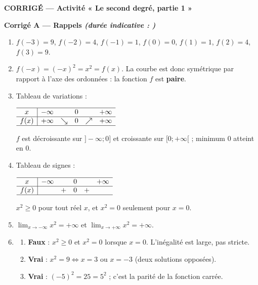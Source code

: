 \documentclass[11pt,a4paper]{article}
\newcommand{\partie}[2]{%
  \vspace{6pt}
  \noindent\colorbox{blue!12}{\parbox{\dimexpr\linewidth-2\fboxsep}{%
    \bfseries\color{blue!50!black} #1 \hfill \normalfont\small\itshape (durée indicative : #2)}}%
  \vspace{4pt}}
\begin{document}
\newpage
\begin{center}
  {\Large\bfseries CORRIGÉ — Activité « Le second degré, partie 1 »}
\end{center}

\partie{Corrigé A — Rappels}{}

\begin{enumerate}[leftmargin=1.4em,itemsep=3pt]
  \item $f(-3)=9$, $f(-2)=4$, $f(-1)=1$, $f(0)=0$, $f(1)=1$, $f(2)=4$, $f(3)=9$.

  \item $f(-x)=(-x)^2=x^2=f(x)$. La courbe est donc symétrique par rapport à l'axe des ordonnées :
  la fonction $f$ est \textbf{paire}.

  \item Tableau de variations :
  \begin{center}
  $\begin{array}{c|ccccc}
  \hline
  x & -\infty & & 0 & & +\infty\\ \hline
  f(x) & +\infty & \searrow & 0 & \nearrow & +\infty\\ \hline
  \end{array}$
  \end{center}
  $f$ est décroissante sur $]-\infty;0]$ et croissante sur $[0;+\infty[$ ; minimum $0$ atteint en $0$.

  \item Tableau de signes :
  \begin{center}
  $\begin{array}{c|ccccc}
  \hline
  x & -\infty & & 0 & & +\infty\\ \hline
  f(x) & & + & 0 & + & \\ \hline
  \end{array}$
  \end{center}
  $x^2\geq 0$ pour tout réel $x$, et $x^2=0$ seulement pour $x=0$.

  \item $\displaystyle\lim_{x\to-\infty}x^2=+\infty$ et $\displaystyle\lim_{x\to+\infty}x^2=+\infty$.

  \item
  \begin{enumerate}[label=\alph*),leftmargin=1.6em,itemsep=1pt]
    \item \textbf{Faux} : $x^2\geq 0$ et $x^2=0$ lorsque $x=0$. L'inégalité est large, pas stricte.
    \item \textbf{Vrai} : $x^2=9\iff x=3$ ou $x=-3$ (deux solutions opposées).
    \item \textbf{Vrai} : $(-5)^2=25=5^2$ ; c'est la parité de la fonction carrée.
  \end{enumerate}
\end{enumerate}
\end{document}

